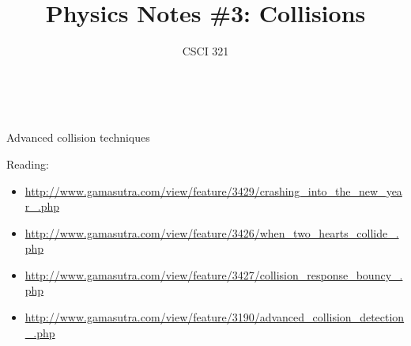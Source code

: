 \documentclass[handout,t,compress]{beamer}
\title{Physics Notes \#3: Collisions}
\author{CSCI 321}
\institute{WWU}
\newcommand{\bframe}[1]{\begin{frame}[fragile]{#1}}
\begin{document}
\small
{}

\bframe{~}
\titlepage
\end{frame}

\bframe{Advanced collision techniques}

Reading:
\begin{itemize}
\item {\tiny
\url{http://www.gamasutra.com/view/feature/3429/crashing_into_the_new_year_.php}}
\item {\tiny
\url{http://www.gamasutra.com/view/feature/3426/when_two_hearts_collide_.php}}
\item {\tiny
\url{http://www.gamasutra.com/view/feature/3427/collision_response_bouncy_.php}}
\item {\tiny
\url{http://www.gamasutra.com/view/feature/3190/advanced_collision_detection_.php}
}

\end{itemize}

\end{frame}
\end{document}
